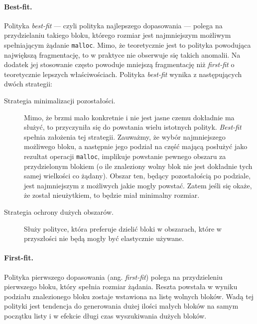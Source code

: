 \documentclass[12pt,a4paper,titlepage,twoside]{mwart}
\begin{document}
\paragraph{Best-fit.}

Polityka \textit{best-fit} --- czyli polityka najlepszego dopasowania --- polega
na przydzielaniu takiego bloku, którego rozmiar jest najmniejszym możliwym
spełniającym żądanie \texttt{malloc}. Mimo, że teoretycznie jest to polityka
powodująca największą fragmentację, to w praktyce nie obserwuje się takich
anomalii. Na dodatek jej stosowanie często powoduje mniejszą fragmentację niż
\textit{first-fit} o teoretycznie lepszych właściwościach. Polityka
\textit{best-fit} wynika z następujących dwóch strategii:
\vspace{-1ex}

\begin{description}
\item[Strategia minimalizacji pozostałości.] Mimo, że brzmi mało konkretnie i
nie jest jasne czemu dokładnie ma służyć, to przyczyniła się do powstania wielu
istotnych polityk. \textit{Best-fit} spełnia założenia tej strategii. Zauważmy,
że wybór najmniejszego możliwego bloku, a następnie jego podział na część
mającą posłużyć jako rezultat operacji \texttt{malloc}, implikuje powstanie
pewnego obszaru za przydzielonym blokiem (o ile znaleziony wolny blok nie jest
dokładnie tych samej wielkości co żądany). Obszar ten, będący pozostałością po
podziale, jest najmniejszym z możliwych jakie mogły powstać. Zatem jeśli się
okaże, że został nieużytkiem, to będzie miał minimalny rozmiar.
\vspace{1ex}

\item[Strategia ochrony dużych obszarów.] Służy polityce, która preferuje
dzielić bloki w obszarach, które w przyszłości nie będą mogły być elastycznie
używane.
\end{description}

\paragraph{First-fit.}

Polityka pierwszego dopasowania (ang. \textit{first-fit}) polega na
przydzieleniu pierwszego bloku, który spełnia rozmiar żądania. Reszta powstała
w wyniku podziału znalezionego bloku zostaje wstawiona na listę wolnych bloków.
Wadą tej polityki jest tendencja do generowania dużej ilości małych bloków na
samym początku listy i w efekcie długi czas wyszukiwania dużych bloków.
\end{document}
